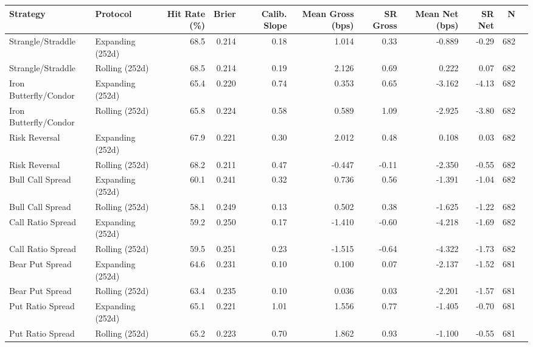 \begin{tabular}{llrrrrrrrrr}
\toprule
Strategy & Protocol & Hit Rate (\%) & Brier & Calib. Slope & Mean Gross (bps) & SR Gross & Mean Net (bps) & SR Net & N \\
\midrule
Strangle/Straddle & Expanding (252d) & 68.5 & 0.214 & 0.18 & 1.014 & 0.33 & -0.889 & -0.29 & 682 \\
Strangle/Straddle & Rolling (252d) & 68.5 & 0.214 & 0.19 & 2.126 & 0.69 & 0.222 & 0.07 & 682 \\
Iron Butterfly/Condor & Expanding (252d) & 65.4 & 0.220 & 0.74 & 0.353 & 0.65 & -3.162 & -4.13 & 682 \\
Iron Butterfly/Condor & Rolling (252d) & 65.8 & 0.224 & 0.58 & 0.589 & 1.09 & -2.925 & -3.80 & 682 \\
Risk Reversal & Expanding (252d) & 67.9 & 0.221 & 0.30 & 2.012 & 0.48 & 0.108 & 0.03 & 682 \\
Risk Reversal & Rolling (252d) & 68.2 & 0.211 & 0.47 & -0.447 & -0.11 & -2.350 & -0.55 & 682 \\
Bull Call Spread & Expanding (252d) & 60.1 & 0.241 & 0.32 & 0.736 & 0.56 & -1.391 & -1.04 & 682 \\
Bull Call Spread & Rolling (252d) & 58.1 & 0.249 & 0.13 & 0.502 & 0.38 & -1.625 & -1.22 & 682 \\
Call Ratio Spread & Expanding (252d) & 59.2 & 0.250 & 0.17 & -1.410 & -0.60 & -4.218 & -1.69 & 682 \\
Call Ratio Spread & Rolling (252d) & 59.5 & 0.251 & 0.23 & -1.515 & -0.64 & -4.322 & -1.73 & 682 \\
Bear Put Spread & Expanding (252d) & 64.6 & 0.231 & 0.10 & 0.100 & 0.07 & -2.137 & -1.52 & 681 \\
Bear Put Spread & Rolling (252d) & 63.4 & 0.235 & 0.10 & 0.036 & 0.03 & -2.201 & -1.57 & 681 \\
Put Ratio Spread & Expanding (252d) & 65.1 & 0.221 & 1.01 & 1.556 & 0.77 & -1.405 & -0.70 & 681 \\
Put Ratio Spread & Rolling (252d) & 65.2 & 0.223 & 0.70 & 1.862 & 0.93 & -1.100 & -0.55 & 681 \\
\bottomrule
\end{tabular}
